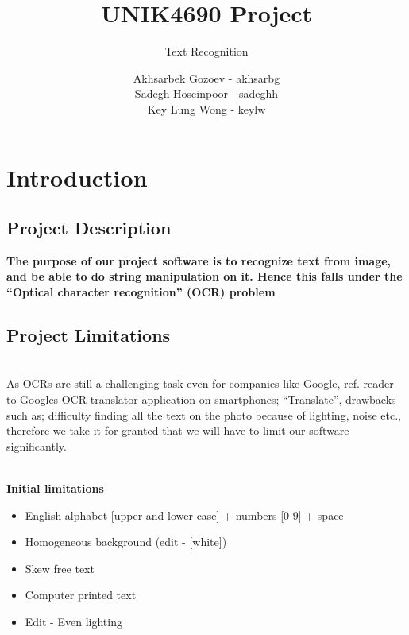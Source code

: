 \documentclass[11pt,a4paper,UKenglish]{article}
\title{UNIK4690 Project}
\subtitle{Text Recognition}
\author{
  Akhsarbek Gozoev  - akhsarbg \\
  Sadegh Hoseinpoor - sadeghh\\
  Key Lung Wong - keylw
}
\begin{document}
\ififorside[kind={Report}]

\newpage
\tableofcontents
\newpage

\section{Introduction}
\label{sec:Introduction}
\subsection{Project Description}
\textbf{The purpose of our project software is to recognize text from image,
and be able to do string manipulation on it. Hence this falls under the
``Optical character recognition'' (OCR) problem}

\subsection{Project Limitations}
\noindent \\ As OCRs are still a challenging task even for companies like
Google, ref. reader to Googles OCR translator application on smartphones;
``Translate'', drawbacks such as; difficulty finding all the text on the photo
because of lighting, noise etc., therefore we take it for granted that we will
have to limit our software significantly.

\noindent \\ \textbf{Initial limitations}
\begin{itemize}
 \item{English alphabet [upper and lower case] + numbers [0-9] + space}
 \item{Homogeneous background (edit - [white])}
 \item{Skew free text}
 \item{Computer printed text}
 \item{Edit - Even lighting}
\end{itemize}
\end{document}
